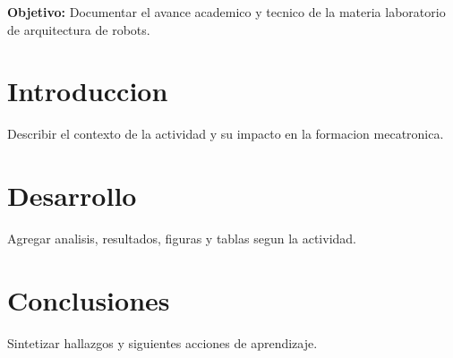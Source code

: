 \documentclass[spanish,letterpaper,oneside]{article}
\begin{document}
\templatePortrait
\templatePagecfg
\onehalfspacing

\begin{abstractd}
\textbf{Objetivo:} Documentar el avance academico y tecnico de la materia laboratorio de arquitectura de robots.
\end{abstractd}

\templateIndex
\templateFinalcfg

\section{Introduccion}
Describir el contexto de la actividad y su impacto en la formacion mecatronica.

\section{Desarrollo}
Agregar analisis, resultados, figuras y tablas segun la actividad.

\section{Conclusiones}
Sintetizar hallazgos y siguientes acciones de aprendizaje.



\end{document}
